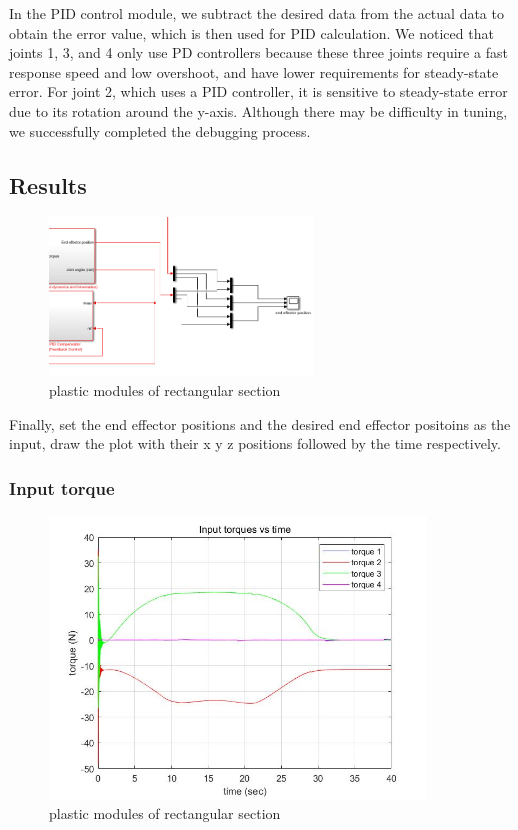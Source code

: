 In the PID control module, we subtract the desired data from the actual data to obtain the error value, which is then used for PID calculation. We noticed that joints 1, 3, and 4 only use PD controllers because these three joints require a fast response speed and low overshoot, and have lower requirements for steady-state error. For joint 2, which uses a PID controller, it is sensitive to steady-state error due to its rotation around the y-axis. Although there may be difficulty in tuning, we successfully completed the debugging process.


\subsection{Results}

\begin{figure}[htbp]
    \centering
    \includegraphics[width=7cm]{./fig/re.png}
    \caption{plastic modules of rectangular section}
    \label{f1}
\end{figure}

Finally, set the end effector positions and the desired end effector positoins as the input, draw the plot with their x y z positions followed by the time respectively.

\subsubsection*{Input torque}

\begin{figure}[htbp]
    \centering
    \includegraphics[width=10cm]{./fig/3.jpg}
    \caption{plastic modules of rectangular section}
    \label{f1}
\end{figure}

